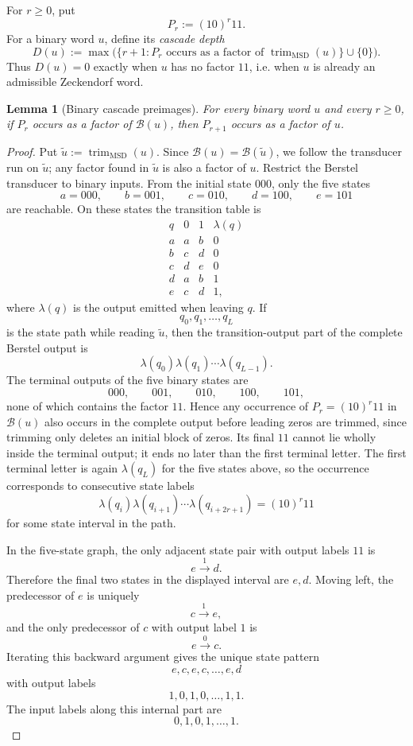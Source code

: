 \documentclass[11pt,letterpaper]{article}
\numberwithin{equation}{section}
\theoremstyle{plain}
\newtheorem{lemma}[theorem]{Lemma}
\theoremstyle{definition}
\theoremstyle{remark}
\newcommand{\Berstel}{\mathcal{B}}
\newcommand{\trimMSD}{\operatorname{trim}_{\mathrm{MSD}}}
\begin{document}
For $r\ge 0$, put
\[
P_r:=(10)^r11 .
\]
For a binary word $u$, define its \emph{cascade depth}
\[
D(u):=\max\bigl(\{r+1:P_r\text{ occurs as a factor of }\trimMSD(u)\}\cup\{0\}\bigr).
\]
Thus $D(u)=0$ exactly when $u$ has no factor $11$, i.e. when $u$ is already an
admissible Zeckendorf word.

\begin{lemma}[Binary cascade preimages]\label{lem:berstel-binary-preimage}
For every binary word $u$ and every $r\ge 0$, if $P_r$ occurs as a factor of
$\Berstel(u)$, then $P_{r+1}$ occurs as a factor of $u$.
\end{lemma}

\begin{proof}
Put $\widetilde u:=\trimMSD(u)$.  Since
$\Berstel(u)=\Berstel(\widetilde u)$, we follow the transducer run on
$\widetilde u$; any factor found in $\widetilde u$ is also a factor of $u$.
Restrict the Berstel transducer to binary inputs.  From the initial state
$000$, only the five states
\[
a=000,\qquad b=001,\qquad c=010,\qquad d=100,\qquad e=101
\]
are reachable.  On these states the transition table is
\[
\begin{array}{c|cc|c}
q&0&1&\lambda(q)\\
\hline
a& a& b&0\\
b& c& d&0\\
c& d& e&0\\
d& a& b&1\\
e& c& d&1 ,
\end{array}
\]
where $\lambda(q)$ is the output emitted when leaving $q$.
If
\[
q_0,q_1,\ldots,q_L
\]
is the state path while reading $\widetilde u$, then the transition-output part of the
complete Berstel output is
\[
\lambda(q_0)\lambda(q_1)\cdots\lambda(q_{L-1}).
\]
The terminal outputs of the five binary states are
\[
000,\qquad 001,\qquad 010,\qquad 100,\qquad 101,
\]
none of which contains the factor $11$.  Hence any occurrence of
$P_r=(10)^r11$ in $\Berstel(u)$ also occurs in the complete output before
leading zeros are trimmed, since trimming only deletes an initial block of
zeros.  Its final $11$ cannot lie wholly inside the terminal output; it ends
no later than the first terminal letter.  The first terminal letter is again
$\lambda(q_L)$ for the five states above, so the occurrence corresponds to
consecutive state labels
\[
\lambda(q_i)\lambda(q_{i+1})\cdots \lambda(q_{i+2r+1})=(10)^r11
\]
for some state interval in the path.

In the five-state graph, the only adjacent state pair with output labels
$11$ is
\[
e\xrightarrow{1}d .
\]
Therefore the final two states in the displayed interval are $e,d$.  Moving
left, the predecessor of $e$ is uniquely
\[
c\xrightarrow{1}e,
\]
and the only predecessor of $c$ with output label $1$ is
\[
e\xrightarrow{0}c .
\]
Iterating this backward argument gives the unique state pattern
\[
e,c,e,c,\ldots,e,d
\]
with output labels
\[
1,0,1,0,\ldots,1,1.
\]
The input labels along this internal part are
\[
0,1,0,1,\ldots,1.
\]


\end{proof}
\end{document}
